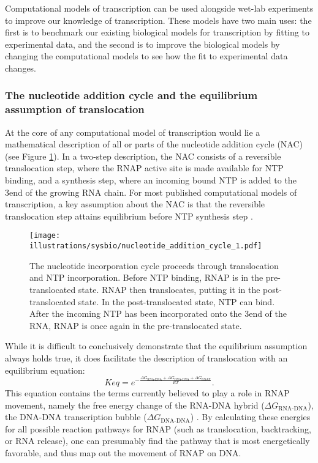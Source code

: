 %
Computational models of transcription can be used alongside wet-lab experiments
to improve our knowledge of transcription. These models have two main uses: the
first is to benchmark our existing biological models for transcription by
fitting to experimental data, and the second is to improve the biological
models by changing the computational models to see how the fit to experimental
data changes.

\subsubsection{The nucleotide addition cycle and the equilibrium assumption of
translocation}
At the core of any computational model of transcription would lie a
mathematical description of all or parts of the nucleotide addition cycle (NAC)
(see Figure \ref{fig:nac_1}). In a two-step description, the NAC consists of a
reversible translocation step, where the RNAP active site is made available for
NTP binding, and a synthesis step, where an incoming bound NTP is added to the
3\ppp end of the growing RNA chain. For most published computational models of
transcription, a key assumption about the NAC is that the reversible
translocation step attains equilibrium before NTP synthesis step
\cite{greive_thinking_2005,bai_mechanochemical_2007,guajardo_model_1997}.

\begin{figure}[htb]
	\begin{center}
		\texttt{[image: illustrations/sysbio/nucleotide\_addition\_cycle\_1.pdf]}
	\end{center}
	\caption{The nucleotide incorporation cycle proceeds through
	translocation and NTP incorporation. Before NTP binding, RNAP is in the
	pre-translocated state. RNAP then translocates, putting it in the
	post-translocated state. In the post-translocated state, NTP can bind.
	After the incoming NTP has been incorporated onto the 3\protect\ppp end of
	the RNA, RNAP is once again in the pre-translocated state.}
	\label{fig:nac_1}
\end{figure}

While it is difficult to conclusively demonstrate that the equilibrium
assumption always holds true, it does facilitate the description of
translocation with an equilibrium equation:
\begin{equation}
	Keq = e^{-\frac{\Delta G_{\text{RNA-DNA}} + \Delta
	G_{\text{DNA-DNA}} + \Delta G_{\text{RNAP}}}{RT}}.
	\label{eq:rnap_energy_balance}
\end{equation}
This equation contains the terms currently believed to play a role in RNAP
movement, namely the free energy change of the RNA-DNA hybrid ($\Delta
G_{\text{RNA-DNA}}$), the DNA-DNA transcription bubble ($\Delta
G_{\text{DNA-DNA}}$) \cite{greive_thinking_2005}. By calculating these energies
for all possible reaction pathways for RNAP (such as translocation,
backtracking, or RNA release), one can presumably find the pathway that is most
energetically favorable, and thus map out the movement of RNAP on DNA.

